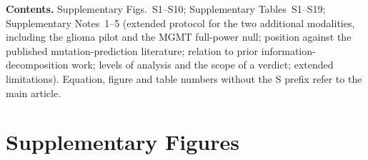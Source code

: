 %
\setcounter{figure}{0}
\setcounter{table}{0}
\renewcommand{\thefigure}{S\arabic{figure}}
\renewcommand{\thetable}{S\arabic{table}}
\renewcommand{\figurename}{Supplementary Fig.}
\renewcommand{\tablename}{Supplementary Table}

\noindent\textbf{Contents.} Supplementary Figs.~S1--S10; Supplementary
Tables~S1--S19; Supplementary Notes~1--5 (extended protocol for the two
additional modalities, including the glioma pilot and the MGMT
full-power null; position against the published mutation-prediction
literature; relation to prior information-decomposition work; levels
of analysis and the scope of a verdict; extended limitations). Equation, figure and table numbers
without the S prefix refer to the main article.

\clearpage
\section*{Supplementary Figures}

